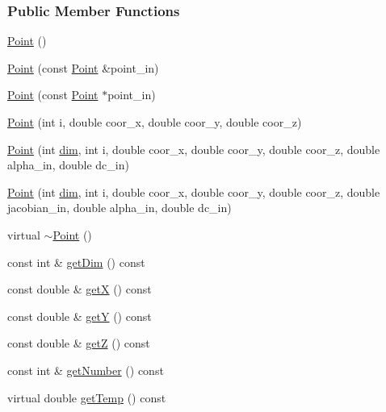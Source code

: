 \subsubsection*{Public Member Functions}
\begin{DoxyCompactItemize}
\item 
\hyperlink{classmknix_1_1_point_ade62bb71dbbd34efa4ed5090f37f2d9a}{Point} ()
\item 
\hyperlink{classmknix_1_1_point_a7788033d9afd368dd8d446d4a20e9cd2}{Point} (const \hyperlink{classmknix_1_1_point}{Point} \&point\+\_\+in)
\item 
\hyperlink{classmknix_1_1_point_a05ad07bb27e53ab3bd8a253cddff5a9e}{Point} (const \hyperlink{classmknix_1_1_point}{Point} $\ast$point\+\_\+in)
\item 
\hyperlink{classmknix_1_1_point_ab94ec4f0045e65b7e80b94ffd75eace1}{Point} (int i, double coor\+\_\+x, double coor\+\_\+y, double coor\+\_\+z)
\item 
\hyperlink{classmknix_1_1_point_a290d5ac42d31be5f6b2a462b422d35e7}{Point} (int \hyperlink{classmknix_1_1_point_ab97e4bca7f299237ff3f8cc2449b1be1}{dim}, int i, double coor\+\_\+x, double coor\+\_\+y, double coor\+\_\+z, double alpha\+\_\+in, double dc\+\_\+in)
\item 
\hyperlink{classmknix_1_1_point_a69ac488240dc683a38330883d3635d87}{Point} (int \hyperlink{classmknix_1_1_point_ab97e4bca7f299237ff3f8cc2449b1be1}{dim}, int i, double coor\+\_\+x, double coor\+\_\+y, double coor\+\_\+z, double jacobian\+\_\+in, double alpha\+\_\+in, double dc\+\_\+in)
\item 
virtual \hyperlink{classmknix_1_1_point_ad20e0663241df1986b8250a0ab7f2358}{$\sim$\+Point} ()
\item 
const int \& \hyperlink{classmknix_1_1_point_a9b6cc39e65e17201533b4ee0fde35419}{get\+Dim} () const 
\item 
const double \& \hyperlink{classmknix_1_1_point_a2942110ac86c21e11986081670bb3a82}{get\+X} () const 
\item 
const double \& \hyperlink{classmknix_1_1_point_a16955d7ef56edea059119f93905e1196}{get\+Y} () const 
\item 
const double \& \hyperlink{classmknix_1_1_point_a739698b4f6a21b40e7fc7c82af69c479}{get\+Z} () const 
\item 
const int \& \hyperlink{classmknix_1_1_point_a3e95c009af70a2954a950b3bdaf73aa9}{get\+Number} () const 
\item 
virtual double \hyperlink{classmknix_1_1_point_a7fcc933a13b61e990feaaaaef7c193f6}{get\+Temp} () const 

\end{DoxyCompactItemize}
